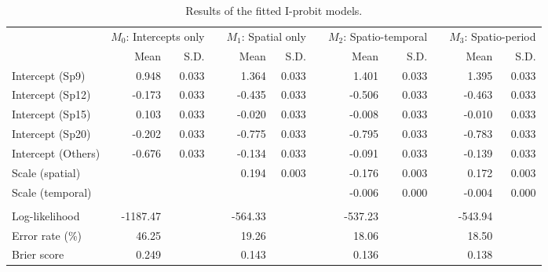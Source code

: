 \documentclass[a4paper,showframe,11pt]{report}\usepackage[]{graphicx}\usepackage[]{color}
\begin{document}
\begin{table}
\caption{\label{tab:table.btb}Results of the fitted I-probit models.}
\centering
\begin{tabular}[t]{lrrrrrrrrrrr}
\toprule
\multicolumn{1}{c}{ } & \multicolumn{2}{r}{$M_0$: Intercepts only} & \multicolumn{1}{c}{ } & \multicolumn{2}{r}{$M_1$: Spatial only} & \multicolumn{1}{c}{ } & \multicolumn{2}{r}{$M_2$: Spatio-temporal} & \multicolumn{1}{c}{ } & \multicolumn{2}{r}{$M_3$: Spatio-period} \\
\cmidrule(l{2pt}r{2pt}){2-3} \cmidrule(l{2pt}r{2pt}){5-6} \cmidrule(l{2pt}r{2pt}){8-9} \cmidrule(l{2pt}r{2pt}){11-12}
  & Mean & S.D. &   & Mean & S.D. &   & Mean & S.D. &   & Mean & S.D.\\
\midrule
Intercept (Sp9) & 0.948 & 0.033 &  & 1.364 & 0.033 &  & 1.401 & 0.033 &  & 1.395 & 0.033\\
Intercept (Sp12) & -0.173 & 0.033 &  & -0.435 & 0.033 &  & -0.506 & 0.033 &  & -0.463 & 0.033\\
Intercept (Sp15) & 0.103 & 0.033 &  & -0.020 & 0.033 &  & -0.008 & 0.033 &  & -0.010 & 0.033\\
Intercept (Sp20) & -0.202 & 0.033 &  & -0.775 & 0.033 &  & -0.795 & 0.033 &  & -0.783 & 0.033\\
Intercept (Others) & -0.676 & 0.033 &  & -0.134 & 0.033 &  & -0.091 & 0.033 &  & -0.139 & 0.033\\[0.5em]
Scale (spatial) &  &  &  & 0.194 & 0.003 &  & -0.176 & 0.003 &  & 0.172 & 0.003\\
Scale (temporal) &  &  &  &  &  &  & -0.006 & 0.000 &  & -0.004 & 0.000\\
\\
Log-likelihood & -1187.47 &  &  & -564.33 &  &  & -537.23 &  &  & -543.94 & \\
Error rate (\%) & 46.25 &  &  & 19.26 &  &  & 18.06 &  &  & 18.50 & \\
Brier score & 0.249 &  &  & 0.143 &  &  & 0.136 &  &  & 0.138 & \\
\bottomrule
\end{tabular}
\end{table}
\end{document}
